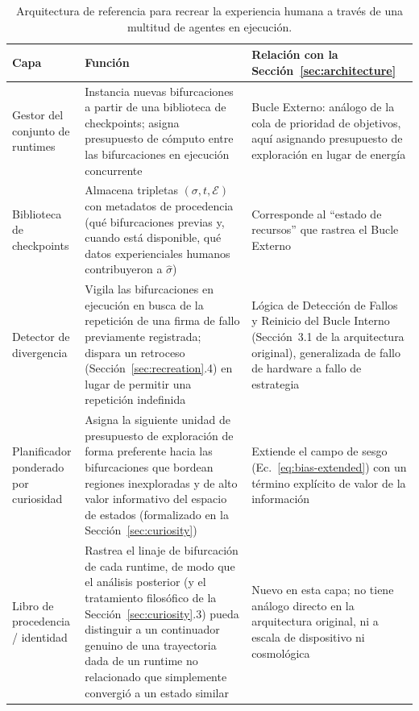 \documentclass[11pt]{article}
\begin{document}
\begin{table}[h]
\centering
\small
\begin{tabular}{@{}p{3.2cm}p{5.6cm}p{5cm}@{}}
\toprule
\textbf{Capa} & \textbf{Función} & \textbf{Relación con la Sección~\ref{sec:architecture}} \\
\midrule
Gestor del conjunto de runtimes & Instancia nuevas bifurcaciones a partir de una biblioteca de checkpoints; asigna presupuesto de cómputo entre las bifurcaciones en ejecución concurrente & Bucle Externo: análogo de la cola de prioridad de objetivos, aquí asignando presupuesto de exploración en lugar de energía \\
Biblioteca de checkpoints & Almacena tripletas $(\sigma, t, \mathcal{E})$ con metadatos de procedencia (qué bifurcaciones previas y, cuando está disponible, qué datos experienciales humanos contribuyeron a $\hat\sigma$) & Corresponde al ``estado de recursos'' que rastrea el Bucle Externo \\
Detector de divergencia & Vigila las bifurcaciones en ejecución en busca de la repetición de una firma de fallo previamente registrada; dispara un retroceso (Sección~\ref{sec:recreation}.4) en lugar de permitir una repetición indefinida & Lógica de Detección de Fallos y Reinicio del Bucle Interno (Sección~3.1 de la arquitectura original), generalizada de fallo de hardware a fallo de estrategia \\
Planificador ponderado por curiosidad & Asigna la siguiente unidad de presupuesto de exploración de forma preferente hacia las bifurcaciones que bordean regiones inexploradas y de alto valor informativo del espacio de estados (formalizado en la Sección~\ref{sec:curiosity}) & Extiende el campo de sesgo (Ec.~\ref{eq:bias-extended}) con un término explícito de valor de la información \\
Libro de procedencia / identidad & Rastrea el linaje de bifurcación de cada runtime, de modo que el análisis posterior (y el tratamiento filosófico de la Sección~\ref{sec:curiosity}.3) pueda distinguir a un continuador genuino de una trayectoria dada de un runtime no relacionado que simplemente convergió a un estado similar & Nuevo en esta capa; no tiene análogo directo en la arquitectura original, ni a escala de dispositivo ni cosmológica \\
\bottomrule
\end{tabular}
\caption{Arquitectura de referencia para recrear la experiencia humana a través de una multitud de agentes en ejecución.}
\label{tab:architecture}
\end{table}
\end{document}
